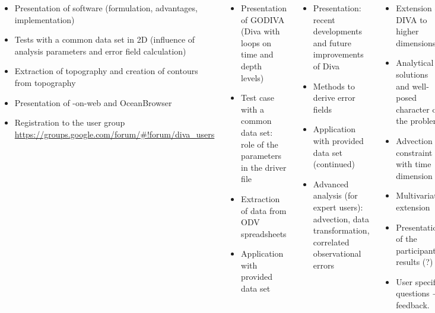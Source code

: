 \begin{frame}[t]
{\begin{columns}[totalwidth=\textwidth]
\begin{itemize}
\scriptsize
\item[\CheckedBox] Presentation of \diva software (formulation, advantages, implementation)
\item[\CheckedBox] Tests with a common data set in 2D (influence of analysis parameters and error field calculation)
\item[\CheckedBox] Extraction of topography and creation of contours from topography
\item[\CheckedBox] Presentation of \diva-on-web and OceanBrowser
\item[\CheckedBox] Registration to the \diva user group \url{https://groups.google.com/forum/\#!forum/diva_users}
\end{itemize}

\begin{itemize}
\scriptsize
\item[\CheckedBox] Presentation of GODIVA (Diva with loops on time and depth levels)
\item[\CheckedBox] Test case with a common data set: role of the parameters in the driver file
\item[\CheckedBox] Extraction of data from ODV spreadsheets
\item[\CheckedBox] Application with provided data set
\end{itemize}


\begin{itemize}
\scriptsize
\item[\CheckedBox] Presentation: recent developments and future improvements of Diva
\item[\CheckedBox] Methods to derive error fields
\item[\CheckedBox] Application with provided data set (continued)
\item[\CheckedBox] Advanced analysis (for expert users): advection, data transformation, correlated observational errors
\end{itemize}

\begin{itemize}
\scriptsize
\item[\CheckedBox] Extension of DIVA to higher dimensions
\item[\CheckedBox] Analytical solutions and well-posed character of the problem
\item[\CheckedBox] Advection constraint with time dimension
\item[\CheckedBox] Multivariate extension
\item[\CheckedBox] Presentation of the participants results (?)
\item[\CheckedBox] User specific questions + feedback.
\end{itemize}

\end{columns}
}
\end{frame}

